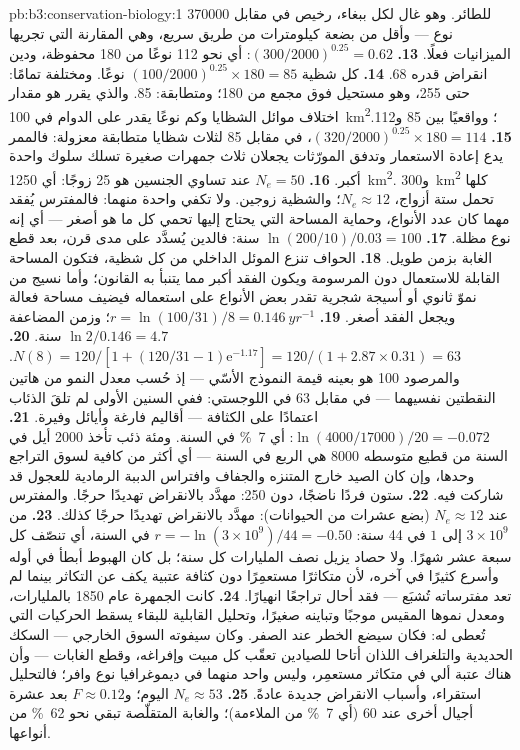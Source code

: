 \begin{solution}{pb:b3:conservation-biology:1}
\num{370000} للطائر. وهو غال لكل ببغاء، رخيص في مقابل نوع
--- وأقل من بضعة كيلومترات من طريق سريع، وهي المقارنة التي تجريها
الميزانيات فعلًا.
\textbf{13.} $(300/2000)^{0.25} = 0.62$: أي نحو 112 نوعًا من 180 محفوظة،
ودين انقراض قدره 68.
\textbf{14.} كل شظية $(100/2000)^{0.25}\times 180 = 85$ نوعًا.
ومختلفة تمامًا: حتى 255، وهو مستحيل فوق مجمع من 180؛
ومتطابقة: 85. والذي يقرر هو مقدار اختلاف موائل الشظايا
وكم نوعًا يقدر على الدوام في \qty{100}{km^2}؛ وواقعيًا
بين 85 و112.
\textbf{15.} $(320/2000)^{0.25}\times 180 = 114$، في مقابل 85 لثلاث
شظايا متطابقة معزولة: فالممر يدع إعادة الاستعمار
وتدفق المورّثات يجعلان ثلاث جمهرات صغيرة تسلك سلوك واحدة أكبر.
\textbf{16.} $N_{e} = 50$ عند تساوي الجنسين هو 25 زوجًا: أي \qty{1250}{km^2}.
و\qty{300}{km^2} كلها تحمل ستة أزواج، $N_{e} \approx 12$؛ والشظية
زوجين. ولا تكفي واحدة منهما: فالمفترس يُفقد مهما كان عدد
الأنواع، وحماية المساحة التي يحتاج إليها تحمي كل ما هو
أصغر --- أي إنه نوع مظلة.
\textbf{17.} $\ln(200/10)/0.03 = 100$ سنة: فالدين يُسدَّد على مدى
قرن، بعد قطع الغابة بزمن طويل.
\textbf{18.} الحواف تنزع الموئل الداخلي من كل شظية، فتكون
المساحة القابلة للاستعمال دون المرسومة ويكون الفقد أكبر مما
يتنبأ به القانون؛ وأما نسيج من نموّ ثانوي أو أسيجة شجرية تقدر بعض
الأنواع على استعماله فيضيف مساحة فعالة ويجعل الفقد أصغر.
\textbf{19.} $r = \ln(100/31)/8 = \qty{0.146}{yr^{-1}}$؛ وزمن المضاعفة
$\ln 2/0.146 = 4.7$ سنة.
\textbf{20.} $N(8) = 120/[1 + (120/31 - 1)\mathrm{e}^{-1.17}] = 120/(1 +
2.87\times 0.31) = 63$. والمرصود 100 هو بعينه قيمة النموذج
الأسّي --- إذ حُسب معدل النمو من هاتين النقطتين نفسيهما --- في
مقابل 63 في اللوجستي: ففي السنين الأولى لم تلقَ الذئاب
اعتمادًا على الكثافة --- أقاليم فارغة وأيائل وفيرة.
\textbf{21.} $\ln(4000/\num{17000})/20 = -0.072$: أي \qty{7}{\%} في السنة.
ومئة ذئب تأخذ \num{2000} أيل في السنة من قطيع متوسطه
\num{8000} هي الربع في السنة --- أي أكثر من كافية لسوق التراجع
وحدها، وإن كان الصيد خارج المتنزه والجفاف وافتراس الدببة
الرمادية للعجول قد شاركت فيه.
\textbf{22.} ستون فردًا ناضجًا، دون 250: مهدَّد بالانقراض تهديدًا حرجًا.
والمفترس عند $N_{e} \approx 12$ (بضع عشرات من الحيوانات): مهدَّد بالانقراض
تهديدًا حرجًا كذلك.
\textbf{23.} من $3\times 10^{9}$ إلى $1$ في 44 سنة: $r = -\ln(3\times
10^{9})/44 = -0.50$ في السنة، أي تنصّف كل سبعة عشر شهرًا. ولا
حصاد يزيل نصف المليارات كل سنة؛ بل كان الهبوط أبطأ في
أوله وأسرع كثيرًا في آخره، لأن متكاثرًا مستعمِرًا دون
كثافة عتبية يكف عن التكاثر بينما لم تعد مفترساته تُشبَع
--- فقد أحال  تراجعًا انهيارًا.
\textbf{24.} كانت الجمهرة عام 1850 بالمليارات، ومعدل نموها المقيس
موجبًا وتباينه صغيرًا، وتحليل القابلية للبقاء يسقط الحركيات
التي تُعطى له: فكان سيضع الخطر عند الصفر.
وكان سيفوته السوق الخارجي --- السكك الحديدية والتلغراف
اللذان أتاحا للصيادين تعقّب كل مبيت وإفراغه، وقطع الغابات --- وأن
هناك عتبة ألي في متكاثر مستعمِر، وليس واحد منهما في
ديموغرافيا نوع وافر؛ فالتحليل استقراء، وأسباب
الانقراض جديدة عادةً.
\textbf{25.} $N_{e} \approx 53$ اليوم؛ و$F \approx 0.12$ بعد عشرة أجيال
أخرى عند 60 (أي \qty{7}{\%} من الملاءمة)؛ والغابة المتقلّصة تبقي
نحو \qty{62}{\%} من أنواعها.
\end{solution}
